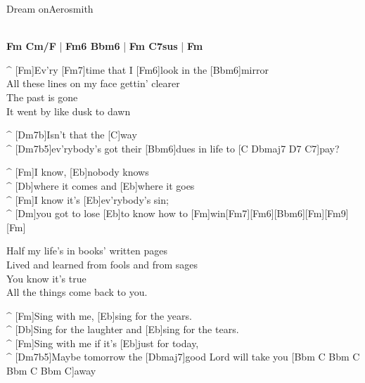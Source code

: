 \begin{song}{Dream on}{Aerosmith}

\\
\textbf{Fm  Cm/F}  | \textbf{Fm6  Bbm6} | \textbf{Fm  C7sus} | \textbf{Fm}

\begin{guitar}
^ [Fm]Ev'ry [Fm7]time that I [Fm6]look in the [Bbm6]mirror\\
All these lines on my  face gettin' clearer\\
The past is gone\\
It went by like dusk to dawn\\
\end{guitar}

\begin{guitar}
^ [Dm7b]Isn't that the [C]way \\
^ [Dm7b5]ev'rybody's got their [Bbm6]dues in life to [C Dbmaj7 D7 C7]pay?\\
\end{guitar}

\begin{guitar}
^ [Fm]I know, [Eb]nobody knows \\
^ [Db]where it comes and [Eb]where it goes\\
^ [Fm]I know it's [Eb]ev'rybody's sin; \\
^ [Dm]you got to lose [Eb]to know how to [Fm]win[Fm7][Fm6][Bbm6][Fm][Fm9][Fm]\\
\end{guitar}

\begin{guitar}
Half my life's in books' written pages  \\
Lived and learned from fools and from sages\\
You know it's true\\
All the things come back to you.\\
\end{guitar}

\begin{guitar}
^ [Fm]Sing with me, [Eb]sing for the years. \\
^ [Db]Sing for the laughter and [Eb]sing for the tears.\\
^ [Fm]Sing with me if it's [Eb]just for today,\\
^ [Dm7b5]Maybe tomorrow the [Dbmaj7]good Lord will take you [Bbm  C Bbm C Bbm C Bbm C]away\\
\end{guitar}


\end{song}
